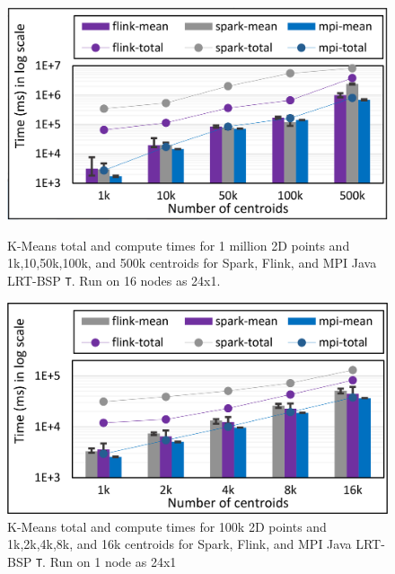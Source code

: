 \documentclass[10pt, conference, compsocconf]{IEEEtran}
\begin{document}
\begin{figure}[!htb]
	\begin{minipage}{0.49\textwidth}
        \centering
        \includegraphics[width=1\columnwidth]{images/fig_kmeans_1mil_varying_centers_Flink_Spark_MPI}
        \caption{K-Means total and compute times for 1 million 2D points and 1k,10,50k,100k, and 500k centroids for Spark, Flink, and \ac{MPI} Java \ac{LRT-BSP} \texttt{T}. Run on 16 nodes as 24x1.}
        \label{fig:fig_kmeans_1mil_varying_centers_Flink_Spark_MPI}
    \end{minipage}
    \hspace{1.4mm}
    \begin{minipage}{0.49\textwidth}
        \centering
        \includegraphics[width=1\columnwidth]{images/fig_kmeans_100k_varying_centers_Flink_Spark_MPI}
        \caption{K-Means total and compute times for 100k 2D points and 1k,2k,4k,8k, and 16k centroids for Spark, Flink, and \ac{MPI} Java \ac{LRT-BSP} \texttt{T}. Run on 1 node as 24x1}
        \label{fig:fig_kmeans_100k_varying_centers_Flink_Spark_MPI}
    \end{minipage}
\end{figure}
\end{document}
